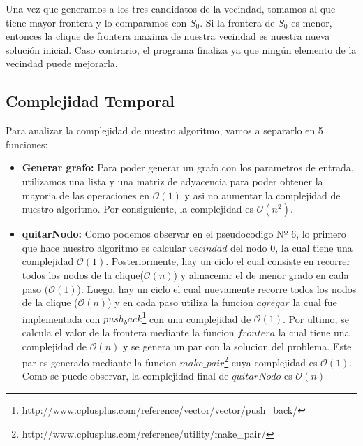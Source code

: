 Una vez que generamos a los tres candidatos de la vecindad, tomamos al que tiene mayor frontera y lo comparamos con $S_{0}$. Si la frontera de $S_{0}$ es menor, entonces la clique de frontera maxima de nuestra vecindad es nuestra nueva solución inicial. Caso contrario, el programa finaliza ya que ningún elemento de la vecindad puede mejorarla.

\subsection{Complejidad Temporal}
Para analizar la complejidad de nuestro algoritmo, vamos a separarlo en 5 funciones:
\begin{itemize}
\item \textbf{Generar grafo:} \newline
Para poder generar un grafo con los parametros de entrada, utilizamos una lista y una matriz de adyacencia para poder obtener la mayoria de las operaciones en $\mathcal{O}(1)$ y asi no aumentar la complejidad de nuestro algoritmo. Por consiguiente, la complejidad es $\mathcal{O}(n^{2})$.

\item \textbf{quitarNodo:} \newline
Como podemos observar en el pseudocodigo Nº 6, lo primero que hace nuestro algoritmo es calcular $vecindad$ del nodo 0, la cual tiene una complejidad $\mathcal{O}(1)$. Posteriormente, hay un ciclo el cual consiste en recorrer todos los nodos de la clique($\mathcal{O}(n)$) y almacenar el de menor grado en cada paso ($\mathcal{O}(1)$).
\newline
Luego, hay un ciclo el cual nuevamente recorre todos los nodos de la clique ($\mathcal{O}(n)$) y en cada paso utiliza la funcion $agregar$ la cual fue implementada con $push_back$\footnote{http://www.cplusplus.com/reference/vector/vector/push\_back/} con una complejidad de $\mathcal{O}(1)$.
\newline
Por ultimo, se calcula el valor de la frontera mediante la funcion $frontera$ la cual tiene una complejidad de $\mathcal{O}(n)$ y se genera un par con la solucion del problema. Este par es generado mediante la funcion $make\_pair$\footnote{http://www.cplusplus.com/reference/utility/make\_pair/} cuya complejidad es $\mathcal{O}(1)$.
\newline
Como se puede observar, la complejidad final de $quitarNodo$ es $\mathcal{O}(n)$


\end{itemize}
